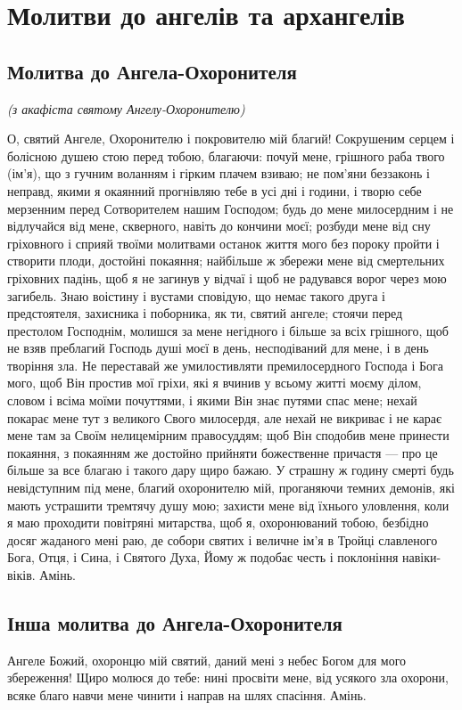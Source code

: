 \documentclass[chapters.tex]{subfiles}
\begin{document}
\chapter{Молитви до ангелів та архангелів}
\section{Молитва до Ангела-Охоронителя}
\emph{(з акафіста святому Ангелу-Охоронителю)}

О, святий Ангеле, Охоронителю і покровителю мій благий! Сокрушеним серцем і болісною душею стою перед тобою, благаючи: почуй мене, грішного раба твого (ім’я), що з гучним воланням і гірким плачем взиваю; не пом’яни беззаконь і неправд, якими я окаянний прогнівляю тебе в усі дні і години, і творю себе мерзенним перед Сотворителем нашим Господом; будь до мене милосердним і не відлучайся від мене, скверного, навіть до кончини моєї; розбуди мене від сну гріховного і сприяй твоїми молитвами останок життя мого без пороку пройти і створити плоди, достойні покаяння; найбільше ж збережи мене від смертельних гріховних падінь, щоб я не загинув у відчаї і щоб не радувався ворог через мою загибель. Знаю воістину і вустами сповідую, що немає такого друга і предстоятеля, захисника і поборника, як ти, святий ангеле; стоячи перед престолом Господнім, молишся за мене негідного і більше за всіх грішного, щоб не взяв преблагий Господь душі моєї в день, несподіваний для мене, і в день творіння зла. Не переставай же умилостивляти премилосердного Господа і Бога мого, щоб Він простив мої гріхи, які я вчинив у всьому житті моєму ділом, словом і всіма моїми почуттями, і якими Він знає путями спас мене; нехай покарає мене тут з великого Свого милосердя, але нехай не викриває і не карає мене там за Своїм нелицемірним правосуддям; щоб Він сподобив мене принести покаяння, з покаянням же достойно прийняти божественне причастя — про це більше за все благаю і такого дару щиро бажаю. У страшну ж годину смерті будь невідступним під мене, благий охоронителю мій, проганяючи темних демонів, які мають устрашити тремтячу душу мою; захисти мене від їхнього уловлення, коли я маю проходити повітряні митарства, щоб я, охоронюваний тобою, безбідно досяг жаданого мені раю, де собори святих і величне ім’я в Тройці славленого Бога, Отця, і Сина, і Святого Духа, Йому ж подобає честь і поклоніння навіки-віків. Амінь.

\section{Інша молитва до Ангела-Охоронителя}
Ангеле Божий, охоронцю мій святий, даний мені з небес Богом для мого збереження! Щиро молюся до тебе: нині просвіти мене, від усякого зла охорони, всяке благо навчи мене чинити і направ на шлях спасіння. Амінь.
\end{document}
